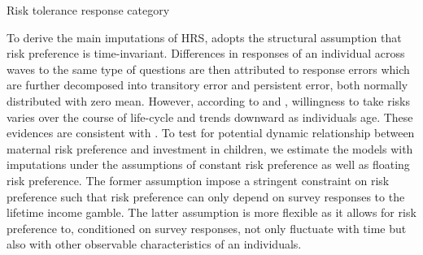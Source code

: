 \documentclass[emulatestandardclasses, 10pt, abstract = true]{scrartcl}
\begin{document}
\begin{table}[!b]
	\centering
	\setlength{\extrarowheight}{0.3em}
	\caption{Risk tolerance response category}	
	
	\label{table:risk-bound}
\end{table}

To derive the main imputations of HRS, \citet{kimball2008imputing} adopts the structural assumption that risk preference is time-invariant. Differences in responses of an individual across waves to the same type of questions are then attributed to response errors which are further decomposed into transitory error and persistent error, both normally distributed with zero mean. However, according to \citet{dohmen2011individual} and \citet{dohmen2017risk}, willingness to take risks varies over the course of life-cycle and trends downward as individuals age. These evidences are consistent with \citet{sahm2012much}. To test for potential dynamic relationship between maternal risk preference and investment in children, we estimate the models with imputations under the assumptions of constant risk preference as well as floating risk preference. The former assumption impose a stringent constraint on risk preference such that risk preference can only depend on survey responses to the lifetime income gamble. The latter assumption is more flexible as it allows for risk preference to, conditioned on survey responses, not only fluctuate with time but also with other observable characteristics of an individuals.  
\end{document}
